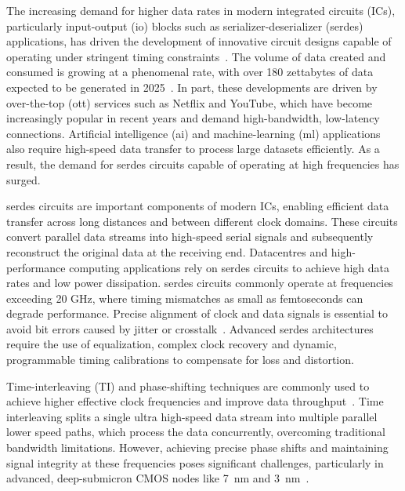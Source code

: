 The increasing demand for higher data rates in modern integrated circuits (ICs), particularly input-output (\gls{io}) blocks such as serializer-deserializer (\gls{serdes}) applications, has driven the development of innovative circuit designs capable of operating under stringent timing constraints~\cite{horowitz2005scaling,seok2010progress}. The volume of data created and consumed is growing at a phenomenal rate, with over 180 zettabytes of data expected to be generated in 2025~\cite{consultancy2024data}. In part, these developments are driven by over-the-top (\gls{ott}) services such as Netflix and YouTube, which have become increasingly popular in recent years and demand high-bandwidth, low-latency connections. Artificial intelligence (\gls{ai}) and machine-learning (\gls{ml}) applications also require high-speed data transfer to process large datasets efficiently. As a result, the demand for \gls{serdes} circuits capable of operating at high frequencies has surged.

\gls{serdes} circuits are important components of modern ICs, enabling efficient data transfer across long distances and between different clock domains. These circuits convert parallel data streams into high-speed serial signals and subsequently reconstruct the original data at the receiving end. Datacentres and high-performance computing applications rely on \gls{serdes} circuits to achieve high data rates and low power dissipation. \gls{serdes} circuits commonly operate at frequencies exceeding 20 GHz, where timing mismatches as small as femtoseconds can degrade performance. Precise alignment of clock and data signals is essential to avoid bit errors caused by jitter or crosstalk~\cite{lee2011self,nakamura2022high}. Advanced \gls{serdes} architectures require the use of equalization, complex clock recovery and dynamic, programmable timing calibrations to compensate for loss and distortion.

Time-interleaving (TI) and phase-shifting techniques are commonly used to achieve higher effective clock frequencies and improve data throughput~\cite{Razavi2009PLL}. Time interleaving splits a single ultra high-speed data stream into multiple parallel lower speed paths, which process the data concurrently, overcoming traditional bandwidth limitations. However, achieving precise phase shifts and maintaining signal integrity at these frequencies poses significant challenges, particularly in advanced, deep-submicron CMOS nodes like 7~nm and 3~nm~\cite{loke2019nanoscale,caignet2001challenge}.

